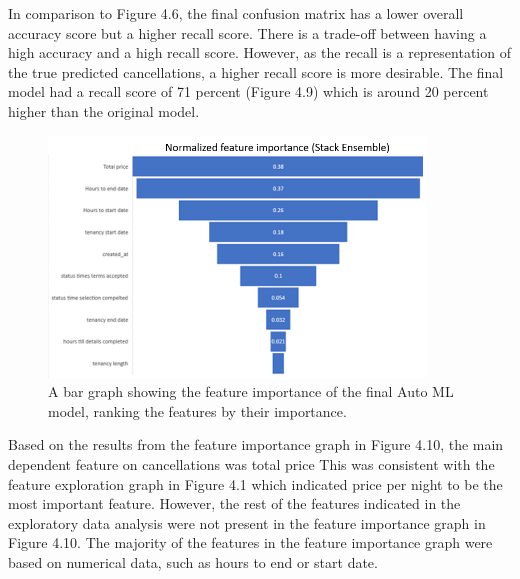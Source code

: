 In comparison to Figure 4.6, the final confusion matrix has a lower overall accuracy score but a higher recall score. There is a trade-off between having a high accuracy and a high recall score. However, as the recall is a representation of the true predicted cancellations, a higher recall score is more desirable. The final model had a recall score of 71 percent (Figure 4.9) which is around 20 percent higher than the original model. 

\begin{figure}[H]
 \centering
 \includegraphics[width=10cm]{figures/feature_importance.png}
 \caption{A bar graph showing the feature importance of the final Auto ML model, ranking the features by their importance. }
\end{figure}

Based on the results from the feature importance graph in Figure 4.10, the main dependent feature on cancellations was total price This was consistent with the feature exploration graph in Figure 4.1 which indicated price per night to be the most important feature. However, the rest of the features indicated in the exploratory data analysis were not present in the feature importance graph in Figure 4.10. The majority of the features in the feature importance graph were based on numerical data, such as hours to end or start date. 


